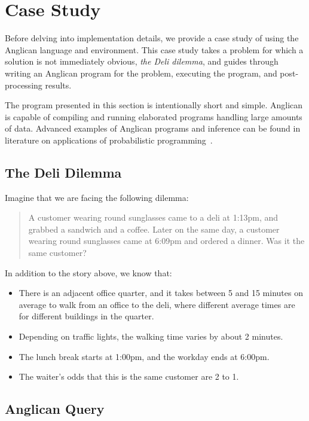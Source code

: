 \documentclass[preprint]{sigplanconf}
\begin{document}
\section{Case Study}
\label{seq:study}

Before delving into implementation details, we provide a case
study of using the Anglican language and environment. This case
study takes a problem for which a solution is not immediately
obvious, \textit{the Deli dilemma}, and guides through writing
an Anglican program for the problem, executing the program, and
post-processing results. 

The program presented in this section is intentionally short and
simple. Anglican is capable of compiling and running elaborated
programs handling large amounts of data. Advanced examples of
Anglican programs and inference can be found in literature on
applications of probabilistic programming~\cite{PLW15, P16, MPT+16}.

\subsection{The Deli Dilemma}
\label{seq:deli}

Imagine that we are facing the following dilemma:
\begin{quote}
A customer wearing round sunglasses came to a deli at 1:13pm,
and grabbed a sandwich and a coffee. Later on the same day, a
customer wearing round sunglasses came at 6:09pm and ordered a
dinner.  Was it the same customer?
\end{quote}
In addition to the story above, we know that:
\begin{itemize}
    \item There is an adjacent office quarter, and it takes
        between 5 and 15 minutes on average to walk from an
        office to the deli, where different average times are  for
        different buildings in the quarter.
    \item Depending on traffic lights, the walking time varies by about 2
        minutes.
    \item The lunch break starts at 1:00pm, and the workday ends at 6:00pm.
    \item The waiter's odds that this is the same customer are 2 to 1.
\end{itemize}

\subsection{Anglican Query}
\label{seq:deli-query}
\end{document}
